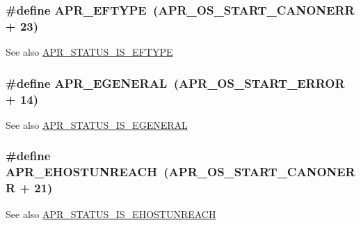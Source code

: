 \subsubsection[{\texorpdfstring{A\+P\+R\+\_\+\+E\+F\+T\+Y\+PE}{APR_EFTYPE}}]{\setlength{\rightskip}{0pt plus 5cm}\#define A\+P\+R\+\_\+\+E\+F\+T\+Y\+PE~({\bf A\+P\+R\+\_\+\+O\+S\+\_\+\+S\+T\+A\+R\+T\+\_\+\+C\+A\+N\+O\+N\+E\+RR} + 23)}\hypertarget{group___a_p_r___error_gac358701354d03c37e3f0de12ed6d9afc}{}\label{group___a_p_r___error_gac358701354d03c37e3f0de12ed6d9afc}
\begin{DoxySeeAlso}{See also}
\hyperlink{group___a_p_r___s_t_a_t_u_s___i_s_gae9db0023f8c7f6ff2cbb0de1f45a0fcf}{A\+P\+R\+\_\+\+S\+T\+A\+T\+U\+S\+\_\+\+I\+S\+\_\+\+E\+F\+T\+Y\+PE} 
\end{DoxySeeAlso}
\subsubsection[{\texorpdfstring{A\+P\+R\+\_\+\+E\+G\+E\+N\+E\+R\+AL}{APR_EGENERAL}}]{\setlength{\rightskip}{0pt plus 5cm}\#define A\+P\+R\+\_\+\+E\+G\+E\+N\+E\+R\+AL~({\bf A\+P\+R\+\_\+\+O\+S\+\_\+\+S\+T\+A\+R\+T\+\_\+\+E\+R\+R\+OR} + 14)}\hypertarget{group___a_p_r___error_ga18f5678bea0c2c704a2b6a186c9e158b}{}\label{group___a_p_r___error_ga18f5678bea0c2c704a2b6a186c9e158b}
\begin{DoxySeeAlso}{See also}
\hyperlink{group___a_p_r___s_t_a_t_u_s___i_s_ga3aa77838dbb8f1b68f778b3cb4f1349d}{A\+P\+R\+\_\+\+S\+T\+A\+T\+U\+S\+\_\+\+I\+S\+\_\+\+E\+G\+E\+N\+E\+R\+AL} 
\end{DoxySeeAlso}
\subsubsection[{\texorpdfstring{A\+P\+R\+\_\+\+E\+H\+O\+S\+T\+U\+N\+R\+E\+A\+CH}{APR_EHOSTUNREACH}}]{\setlength{\rightskip}{0pt plus 5cm}\#define A\+P\+R\+\_\+\+E\+H\+O\+S\+T\+U\+N\+R\+E\+A\+CH~({\bf A\+P\+R\+\_\+\+O\+S\+\_\+\+S\+T\+A\+R\+T\+\_\+\+C\+A\+N\+O\+N\+E\+RR} + 21)}\hypertarget{group___a_p_r___error_ga489b0c02fa7cf33ed6d698d385661f86}{}\label{group___a_p_r___error_ga489b0c02fa7cf33ed6d698d385661f86}
\begin{DoxySeeAlso}{See also}
\hyperlink{group___a_p_r___s_t_a_t_u_s___i_s_ga6692fb87431d5d58747e10273d41c230}{A\+P\+R\+\_\+\+S\+T\+A\+T\+U\+S\+\_\+\+I\+S\+\_\+\+E\+H\+O\+S\+T\+U\+N\+R\+E\+A\+CH} 
\end{DoxySeeAlso}
